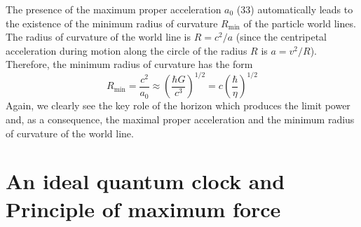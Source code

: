 \documentclass [12pt]{article}
\begin{document}
The presence of the maximum proper acceleration ${a_0}$ (33) automatically leads to the existence of the  minimum  radius of curvature ${R_{\min }}$ of the particle world lines. The radius of curvature of the world line is $R = {c^2}/a$ (since the centripetal acceleration during motion along  the circle of the radius $R$ is $a = {v^2}/R$). Therefore, the minimum radius of curvature has the form
\begin{equation}\label{e38}
  {R_{\min }} = \frac{{{c^2}}}{{{a_0}}} \approx {\left( {\frac{{\hbar G}}{{{c^3}}}} \right)^{1/2}} = c{\left( {\frac{\hbar }{\eta }} \right)^{1/2}}
\end{equation}
Again, we clearly see the key role of the horizon which produces the limit power and, as a consequence,  the maximal proper acceleration and the minimum radius of curvature of the world line.

\section{An ideal quantum clock and Principle of maximum force}
\end{document}
